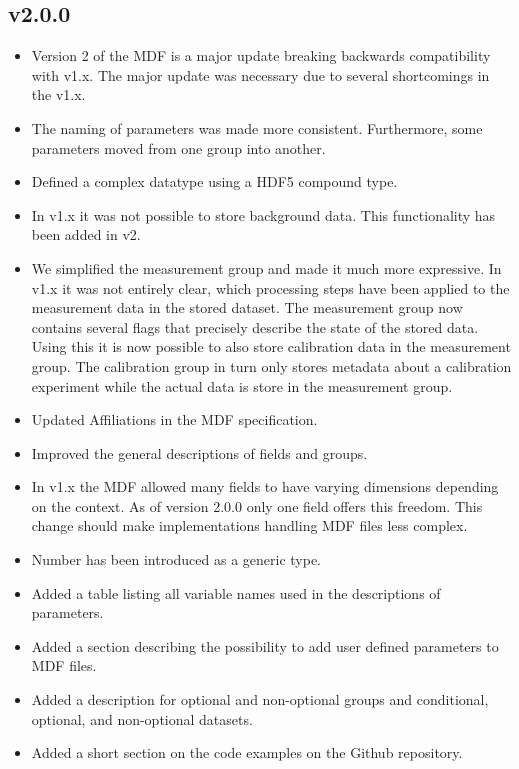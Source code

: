 \documentclass[landscape,a4paper]{article} %
\newcommand{\inlvar}[1]{{\ttfamily#1}}
\begin{document}
\begin{multicols}{2}
\subsection{v2.0.0}

\begin{itemize}
	\item Version 2 of the MDF is a major update breaking backwards compatibility with v1.x. The major update was necessary due to several shortcomings in the v1.x.
	\item The naming of parameters was made more consistent. Furthermore, some parameters moved from one group into another.
	\item Defined a complex datatype using a HDF5 compound type. 
	\item In v1.x it was not possible to store background data. This functionality has been added in v2.
	\item We simplified the measurement group and made it much more expressive. In v1.x it was not entirely clear, which processing steps have been applied to the measurement data in the stored dataset. The \inlvar{measurement} group now contains several flags that precisely describe the state of the stored data. Using this it is now possible to also store calibration data in the \inlvar{measurement} group. The calibration group in turn only stores metadata about a calibration experiment while the actual data is store in the measurement group.
	\item Updated Affiliations in the MDF specification.
	\item Improved the general descriptions of fields and groups.
	\item In v1.x the MDF allowed many fields to have varying dimensions depending on the context. As of version 2.0.0 only one field offers this freedom. This change should make implementations handling MDF files less complex.
	\item \inlvar{Number} has been introduced as a generic type. 
	\item Added a table listing all variable names used in the descriptions of parameters.
	\item Added a section describing the possibility to add user defined parameters to MDF files.
	\item Added a description for optional and non-optional groups and conditional, optional, and non-optional datasets.
    \item Added a short section on the code examples on the Github repository.

\end{itemize}
\end{multicols}
\end{document}
